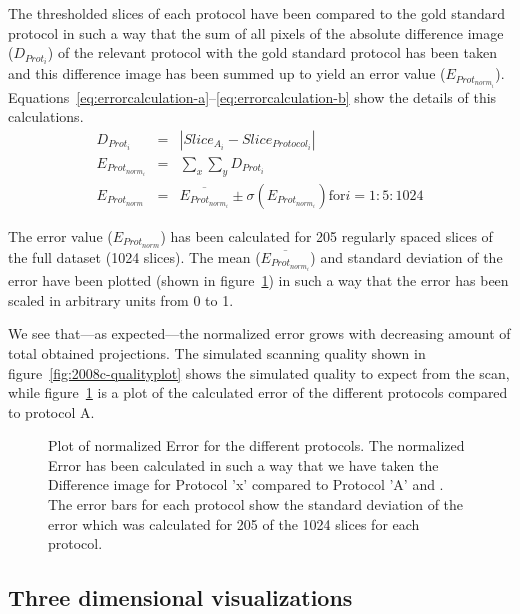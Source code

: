 The thresholded slices of each protocol have been compared to the gold standard protocol in such a way that the sum of all pixels of the absolute difference image ($D_{Prot_{i}}$) of the relevant protocol with the gold standard protocol has been taken and this difference image has been summed up to yield an error value ($E_{Prot_{norm_{i}}}$). Equations~\ref{eq:errorcalculation-a}--\ref{eq:errorcalculation-b} show the details of this calculations.
\begin{eqnarray}
    D_{Prot_{i}} &=& |Slice_{A_{i}}-Slice_{Protocol_{i}}| \label{eq:errorcalculation-a}\\
E_{Prot_{norm_{i}}} &=& \sum_{x}\sum_{y} D_{Prot_{i}} \label{eq:errorcalculation-b}\\
    E_{Prot_{norm}} &=& \overline{E_{Prot_{norm_{i}}}} \pm \sigma(E_{Prot_{norm_{i}}}) \mbox{for} i=1:5:1024 \label{eq:errorcalculation-c}
\end{eqnarray}

The error value ($E_{Prot_{norm}}$) has been calculated for 205 regularly spaced slices of the full dataset (1024 slices). The mean ($\overline{E_{Prot_{norm_{i}}}}$) and standard deviation of the error have been plotted (shown in figure~\ref{fig:NormalizedErrorPlot}) in such a way that the error has been scaled in arbitrary units from 0 to 1.

We see that---as expected---the normalized error grows with decreasing amount of total obtained projections. The simulated scanning quality shown in figure~\ref{fig:2008c-qualityplot} shows the simulated quality to expect from the scan, while figure~\ref{fig:NormalizedErrorPlot} is a plot of the calculated error of the different protocols compared to protocol A.

\begin{figure}
	\centering
		
	\caption{Plot of normalized Error for the different protocols. The normalized Error has been calculated in such a way that we have taken the Difference image for Protocol 'x' compared to Protocol 'A' and . The error bars for each protocol show the standard deviation of the error which was calculated for 205 of the 1024 slices for each protocol.}
	\label{fig:NormalizedErrorPlot}
\end{figure}

\subsection{Three dimensional visualizations}
